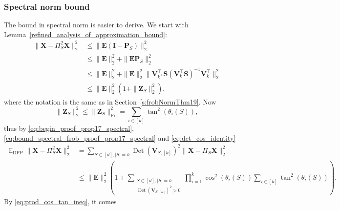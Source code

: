 \documentclass[twoside,11pt]{book}
\numberwithin{theorem}{chapter}
\numberwithin{definition}{chapter}
\numberwithin{proposition}{chapter}
\numberwithin{corollary}{chapter}
\numberwithin{example}{chapter}
\numberwithin{lemma}{chapter}
\numberwithin{assumption}{chapter}
\numberwithin{equation}{chapter}
\numberwithin{figure}{chapter}
\DeclareMathOperator{\Det}{Det}
\DeclareMathOperator{\Fr}{\mathrm{Fr}}
\DeclareMathOperator{\DPP}{\mathrm{DPP}}
\DeclareMathOperator{\Tran}{\intercal}
\DeclareMathOperator{\EX}{\mathbb{E}}
\begin{document}
\subsubsection{Spectral norm bound}
The bound in spectral norm is easier to derive.
We start with Lemma~\ref{refined_analysis_of_approximation_bound}:
\begin{equation}
\label{eq:begin_proof_prop17_spectral}
    \begin{split}
        \| \bm{X} - \Pi_{S}^{2}\bm{X} \|_{2}^{2}  & \leq  \| \bm{E}(\bm{I}-\bm{P}_{S})\|_{2}^{2}\\
        & \leq \| \bm{E}\|_{2}^{2} +  \| \bm{E}\bm{P}_{S}\|_{2}^{2}\\
        & \leq \| \bm{E}\|_{2}^{2} + \|\bm{E}\|_{2}^{2}\|\bm{V}_{k^{\perp}}^{\Tran}\bm{S}(\bm{V}_{k}^{\Tran}\bm{S})^{-1}\bm{V}_{k}^{\Tran}\|_{2}^{2}\\
        & \leq \| \bm{E}\|_{2}^{2}(1 + \|\bm{Z}_{S}\|_{2}^{2}),
    \end{split}
\end{equation}
where the notation is the same as in Section~\ref{s:frobNormThm19}.
Now
\begin{equation}\label{eq:bound_spectral_frob_proof_prop17_spectral}
                \|\bm{Z}_{S}\|_{2}^{2}  \leq  \|\bm{Z}_{S}\|_{\Fr}^{2}
                = \sum\limits_{i \in [k]} \tan^{2}(\theta_{i}(S)),
\end{equation}
thus by \eqref{eq:begin_proof_prop17_spectral}, \eqref{eq:bound_spectral_frob_proof_prop17_spectral} and \eqref{eq:det_cos_identity}
\begin{align}
    \EX_{\DPP} \| \bm{X} - \Pi_{S}^{2}\bm{X} \|_{2}^{2} &= \sum_{S \subset [d], |S| = k}\Det(\bm{V}_{S,[k]})^{2}\| \bm{X} - \Pi_{S}\bm{X} \|_{2}^{2}\\
    & \leq \| \bm{E}\|_{2}^{2} \left(1 + \sum_{\substack{S \subset [d], |S| = k\\   \Det(\bm{V}_{S,[k]})^{2}>0}} \prod\limits_{i =1}^{k} \cos^{2}(\theta_{i}(S)) \sum\limits_{i \in [k]} \tan^{2}(\theta_{i}(S)) \right).
\end{align}
By \eqref{eq:prod_cos_tan_ineq}, it comes
\end{document}

